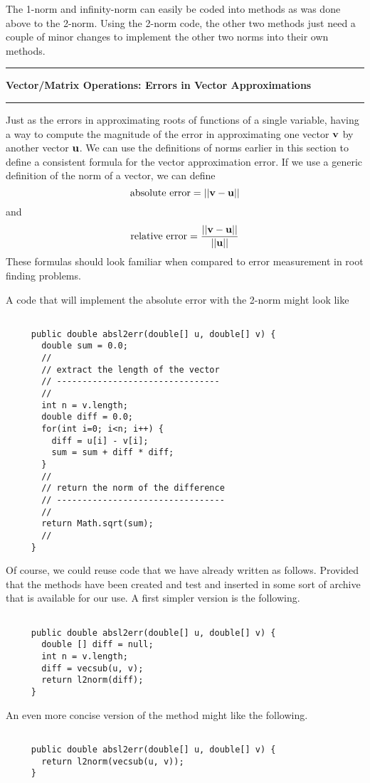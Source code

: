 \documentclass[10pt,fleqn]{article}
\begin{document}
The 1-norm and infinity-norm can easily be coded into methods as was done above
to the 2-norm. Using the 2-norm code, the other two methods just need a couple
of minor changes to implement the other two norms into their own methods.
\newpage
\vskip0.1in\hrule\vskip0.1in
\noindent
{\bf Vector/Matrix Operations: Errors in Vector Approximations}
\vskip0.1in\hrule\vskip0.1in
\noindent
Just as the errors in approximating roots of functions of a single variable,
having a way to compute the magnitude of the error in approximating one vector
${\bf v}$ by another vector ${\bf u}$. We can use the definitions of norms
earlier in this section to define a consistent formula for the vector
approximation error. If we use a generic definition of the norm of a vector, we
can define
$$
  \makebox{absolute error} = || {\bf v} - {\bf u} ||
$$
and
$$
  \makebox{relative error} = {{|| {\bf v} - {\bf u} || }\over{ || {\bf u} || }}
$$
These formulas should look familiar when compared to error measurement in root
finding problems.

A code that will implement the absolute error with the 2-norm might look like
\begin{verbatim}

     public double absl2err(double[] u, double[] v) {
       double sum = 0.0;
       //
       // extract the length of the vector
       // --------------------------------
       //
       int n = v.length;
       double diff = 0.0;
       for(int i=0; i<n; i++) {
         diff = u[i] - v[i];
         sum = sum + diff * diff;
       }
       //
       // return the norm of the difference
       // ---------------------------------
       //
       return Math.sqrt(sum);
       //
     }

\end{verbatim}
Of course, we could reuse code that we have already written as follows. Provided
that the methods have been created and test and inserted in some sort of archive
that is available for our use. A first simpler version is the following.
\begin{verbatim}

     public double absl2err(double[] u, double[] v) {
       double [] diff = null;
       int n = v.length;
       diff = vecsub(u, v);
       return l2norm(diff);
     }

\end{verbatim}
An even more concise version of the method might like the following.
\begin{verbatim}

     public double absl2err(double[] u, double[] v) {
       return l2norm(vecsub(u, v));
     }

\end{verbatim}
\end{document}
